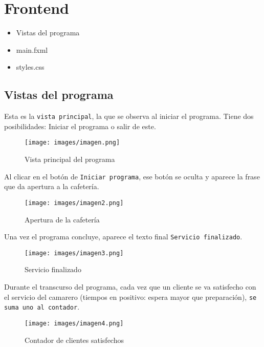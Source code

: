 \documentclass[14pt]{extarticle}
\begin{document}
    \newpage
    \section{Frontend}
        \begin{itemize}
            \item Vistas del programa
            \item main.fxml
            \item styles.css
        \end{itemize}

    \subsection{Vistas del programa}

    Esta es la \texttt{vista principal}, la que se observa al iniciar el programa.  
    Tiene dos posibilidades: Iniciar el programa o salir de este.  

    \begin{figure}[H]
        \centering
        \texttt{[image: images/imagen.png]}
        \caption{Vista principal del programa}
    \end{figure}

    Al clicar en el botón de \texttt{Iniciar programa}, ese botón se oculta y aparece la frase que da apertura a la cafetería.  

    \begin{figure}[H]
        \centering
        \texttt{[image: images/imagen2.png]}
        \caption{Apertura de la cafetería}
    \end{figure}

    Una vez el programa concluye, aparece el texto final \texttt{Servicio finalizado}.  

    \begin{figure}[H]
        \centering
        \texttt{[image: images/imagen3.png]}
        \caption{Servicio finalizado}
    \end{figure}

    Durante el transcurso del programa, cada vez que un cliente se va satisfecho con el servicio del camarero (tiempos en positivo: espera mayor que preparación), \texttt{se suma uno al contador}.  

    \begin{figure}[H]
        \centering
        \texttt{[image: images/imagen4.png]}
        \caption{Contador de clientes satisfechos}
    \end{figure}
\end{document}
